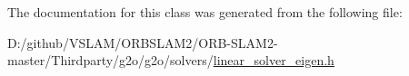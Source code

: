 The documentation for this class was generated from the following file\+:\begin{DoxyCompactItemize}
\item 
D\+:/github/\+V\+S\+L\+A\+M/\+O\+R\+B\+S\+L\+A\+M2/\+O\+R\+B-\/\+S\+L\+A\+M2-\/master/\+Thirdparty/g2o/g2o/solvers/\mbox{\hyperlink{linear__solver__eigen_8h}{linear\+\_\+solver\+\_\+eigen.\+h}}\end{DoxyCompactItemize}

